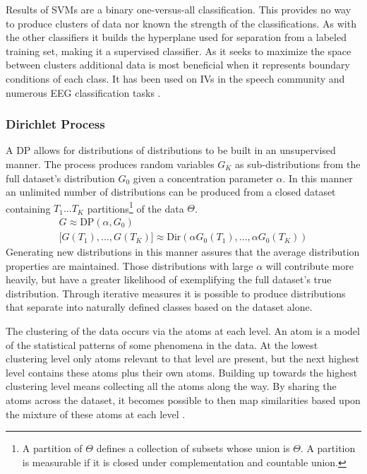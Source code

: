 Results of \acp{SVM} are a binary one-versus-all classification. This provides no way to produce clusters of data nor known the strength of the classifications. As with the other classifiers it builds the hyperplane used for separation from a labeled training set, making it a supervised classifier. As it seeks to maximize the space between clusters additional data is most beneficial when it represents boundary conditions of each class. It has been used on \acp{IV} in the speech community \cite{Cumani2017} and numerous \ac{EEG} classification tasks \cite{Wulsin2011,Radha2014,Brigham2010}.

\subsubsection{Dirichlet Process}

A \ac{DP} allows for distributions of distributions to be built in an unsupervised manner. The process produces random variables $G_{K}$ as sub-distributions from the full dataset's distribution $G_{0}$ given a concentration parameter $\alpha$. In this manner an unlimited number of distributions can be produced from a closed dataset containing $T_{1}...T_{K}$ partitions\footnote{A partition of $\Theta$ defines a collection of subsets whose union is $\Theta$. A partition is measurable if it is closed under complementation and countable union.} of the data $\Theta$\cite{Gershman2012}.
\begin{gather}
G \approx \text{DP}(\alpha,G_{0}) \\
\Big[ G(T_{1}),...,G(T_{K}) \Big] \approx \text{Dir}(\alpha G_{0}(T_{1}),...,\alpha G_{0}(T_{K}))
\end{gather}
Generating new distributions in this manner assures that the average distribution properties are maintained. Those distributions with large $\alpha$ will contribute more heavily, but have a greater likelihood of exemplifying the full dataset's true distribution. Through iterative measures it is possible to produce distributions that separate into naturally defined classes based on the dataset alone.

The clustering of the data occurs via the atoms at each level. An atom is a model of the statistical patterns of some phenomena in the data. At the lowest clustering level only atoms relevant to that level are present, but the next highest level contains these atoms plus their own atoms. Building up towards the highest clustering level means collecting all the atoms along the way. By sharing the atoms across the dataset, it becomes possible to then map similarities based upon the mixture of these atoms at each level \cite{Teh2006}.

